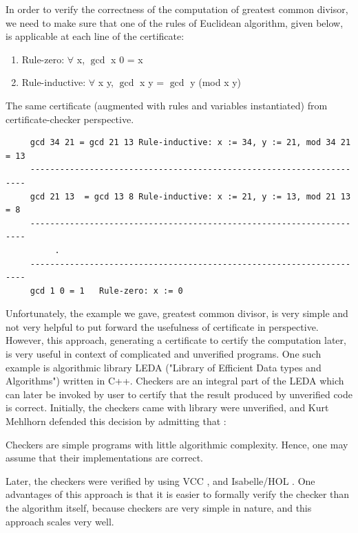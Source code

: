    
   In order to verify the correctness of the computation of greatest common divisor, we need to 
    make sure that one of the rules of Euclidean algorithm, given below, is applicable at 
    each line of the certificate:
   \begin{enumerate}
   \item Rule-zero: $\forall$ x, $\gcd$ x 0 = x
   \item Rule-inductive: $\forall$ x y, $\gcd$ x y = $\gcd$ y (mod x y)
   \end{enumerate}

 \noindent	
  The same certificate (augmented with rules and variables instantiated) from certificate-checker perspective.
    \begin{verbatim}
     gcd 34 21 = gcd 21 13 Rule-inductive: x := 34, y := 21, mod 34 21 = 13
     ---------------------------------------------------------------------
     gcd 21 13  = gcd 13 8 Rule-inductive: x := 21, y := 13, mod 21 13 = 8
     ---------------------------------------------------------------------
          .
     ---------------------------------------------------------------------
     gcd 1 0 = 1   Rule-zero: x := 0 
   \end{verbatim}
   
   
   Unfortunately, the example we gave,  greatest common divisor, is very simple and not very
   helpful to put forward the usefulness of certificate in perspective.
   However, this approach, generating a certificate to certify the computation later, is very useful in context 
   of complicated and unverified  programs.   One such example is algorithmic library  
   LEDA \citep{Mehlhorn:1995:LPC:204865.204889} ("Library of Efficient Data types and Algorithms") 
   written in C++.  Checkers are an integral part of the LEDA 
   which can later be invoked by user to certify that the result produced by unverified 
   code is correct. 
   Initially, the checkers came with library were unverified, and 
   Kurt Mehlhorn defended this decision by admitting that \citep{Alkassar2014}: 
   \begin{displayquote}
   Checkers are simple programs with little algorithmic 
   complexity. Hence, one may assume that their implementations are correct.
	\end{displayquote}   
	\noindent
    Later, the 
   checkers \citep{Alkassar2014} were verified by using VCC \citep{10.1007/978-3-642-03359-9_2}, 
   and Isabelle/HOL \citep{Nipkow:2002:IPA:1791547}.  One advantages of this approach is 
   that it is easier to formally verify the checker than the algorithm itself, because 
   checkers are very simple in nature, and this approach scales very well. 
   
